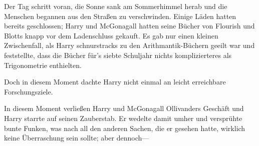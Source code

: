 Der Tag schritt voran, die Sonne sank am Sommerhimmel herab und die Menschen begannen aus den Straßen zu verschwinden. Einige Läden hatten bereits geschlossen; Harry und McGonagall hatten seine Bücher von Flourish und Blotts knapp vor dem Ladenschluss gekauft. Es gab nur einen kleinen Zwischenfall, als Harry schnurstracks zu den Arithmantik-Büchern geeilt war und feststellte, dass die Bücher für's siebte Schuljahr nichts komplizierteres als Trigonometrie enthielten.

Doch in diesem Moment dachte Harry nicht einmal an leicht erreichbare Forschungsziele.

In diesem Moment verließen Harry und McGonagall Ollivanders Geschäft und Harry starrte auf seinen Zauberstab. Er wedelte damit umher und versprühte bunte Funken, was nach all den anderen Sachen, die er gesehen hatte, wirklich keine Überraschung sein sollte; aber dennoch—

